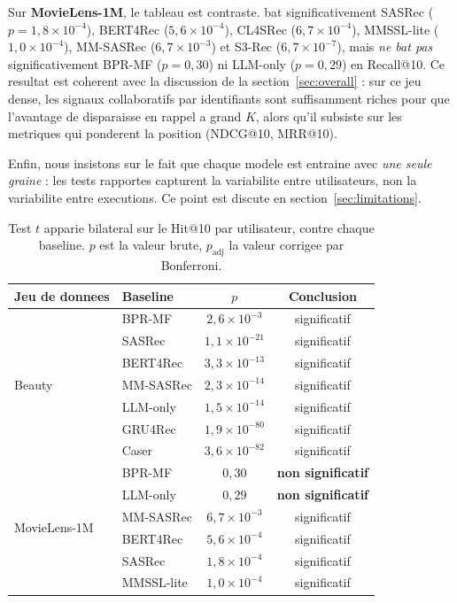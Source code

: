 Sur \textbf{MovieLens-1M}, le tableau est contraste. \model{} bat
significativement SASRec ($p=1{,}8\times 10^{-4}$), BERT4Rec
($5{,}6\times 10^{-4}$), CL4SRec ($6{,}7\times 10^{-4}$), MMSSL-lite
($1{,}0\times 10^{-4}$), MM-SASRec ($6{,}7\times 10^{-3}$) et S3-Rec
($6{,}7\times 10^{-7}$), mais \emph{ne bat pas} significativement BPR-MF
($p=0{,}30$) ni LLM-only ($p=0{,}29$) en Recall@10. Ce resultat est coherent
avec la discussion de la section~\ref{sec:overall} : sur ce jeu dense, les
signaux collaboratifs par identifiants sont suffisamment riches pour que
l'avantage de \model{} disparaisse en rappel a grand $K$, alors qu'il subsiste
sur les metriques qui ponderent la position (NDCG@10, MRR@10).

Enfin, nous insistons sur le fait que chaque modele est entraine avec
\emph{une seule graine} : les tests rapportes capturent la variabilite entre
utilisateurs, non la variabilite entre executions. Ce point est discute en
section~\ref{sec:limitations}.

\begin{table}[t]
\centering
\caption{Test $t$ apparie bilateral sur le Hit@10 par utilisateur, \model{}
contre chaque baseline. $p$ est la valeur brute, $p_{\mathrm{adj}}$ la valeur
corrigee par Bonferroni.}
\label{tab:significance}
\small
\begin{tabular}{llcc}
\toprule
\textbf{Jeu de donnees} & \textbf{Baseline} & \textbf{$p$} & \textbf{Conclusion} \\
\midrule
\multirow{7}{*}{Beauty}
 & BPR-MF    & $2{,}6\times10^{-3}$ & significatif \\
 & SASRec    & $1{,}1\times10^{-21}$ & significatif \\
 & BERT4Rec  & $3{,}3\times10^{-13}$ & significatif \\
 & MM-SASRec & $2{,}3\times10^{-14}$ & significatif \\
 & LLM-only  & $1{,}5\times10^{-14}$ & significatif \\
 & GRU4Rec   & $1{,}9\times10^{-80}$ & significatif \\
 & Caser     & $3{,}6\times10^{-82}$ & significatif \\
\midrule
\multirow{6}{*}{MovieLens-1M}
 & BPR-MF    & $0{,}30$              & \textbf{non significatif} \\
 & LLM-only  & $0{,}29$              & \textbf{non significatif} \\
 & MM-SASRec & $6{,}7\times10^{-3}$  & significatif \\
 & BERT4Rec  & $5{,}6\times10^{-4}$  & significatif \\
 & SASRec    & $1{,}8\times10^{-4}$  & significatif \\
 & MMSSL-lite& $1{,}0\times10^{-4}$  & significatif \\
\bottomrule
\end{tabular}
\end{table}

